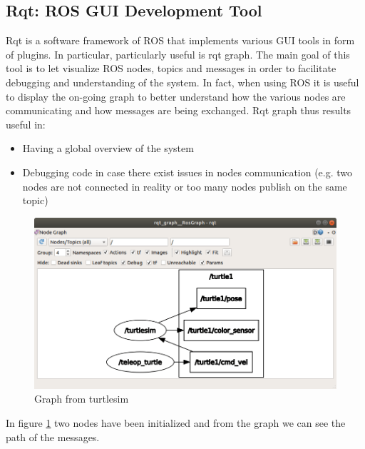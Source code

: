\subsection{Rqt: ROS GUI Development Tool}
Rqt is a software framework of ROS that implements various GUI tools in form of plugins.
In particular, particularly useful is rqt graph.
The main goal of this tool is to let visualize ROS nodes, topics and messages in order to facilitate debugging and understanding of the system. In fact, when using ROS it is useful to display the on-going graph to better understand how the various nodes are communicating and how messages are being exchanged.
Rqt graph thus results useful in:
\begin{itemize}
    \item Having a global overview of the system
    \item Debugging code in case there exist issues in nodes communication (e.g. two nodes are not connected in reality or too many nodes publish on the same topic)
\end{itemize}
\begin{figure}[H]
    \centering
    \includegraphics[scale=0.3]{Images/Chapter 2/rqt_graph_turtlesim.png}
    \caption{Graph from turtlesim}
    \label{fig:rqtgraph}
\end{figure}
In figure \ref{fig:rqtgraph} two nodes have been initialized and from the graph we can see the path of the messages.
